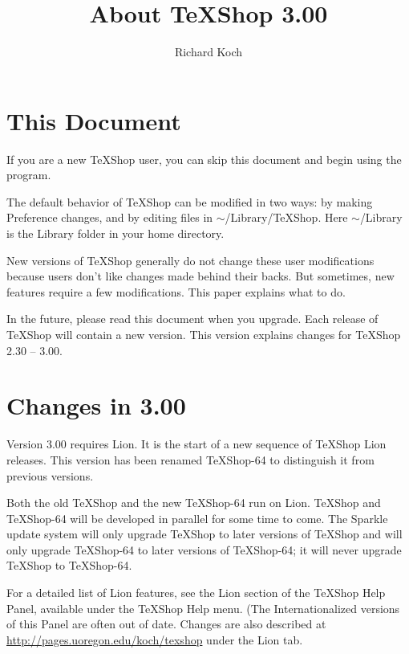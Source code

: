 \documentclass[11pt, oneside]{amsart}
\title{About TeXShop 3.00}
\author{Richard Koch}
\begin{document}
\maketitle

\thispagestyle{empty}
\vspace{-.3in}
\section{This Document}

If you are a new TeXShop user, you can skip this document and begin using the program.

The default behavior of TeXShop can be modified in two ways: by making Preference changes, and by editing files in $\sim$/Library/TeXShop. Here $\sim$/Library is the Library folder in your home directory. 

New versions of TeXShop generally do not change these user modifications because users don't like changes made behind their backs. But sometimes, new features require a few modifications. This paper explains what to do.

In the future, please read this document when you upgrade. Each release of TeXShop will contain a new version. This version explains changes for TeXShop 2.30 -- 3.00.

\section{Changes in 3.00}

Version 3.00 requires Lion. It is the start of a new sequence of TeXShop Lion releases. This version has been renamed TeXShop-64 to distinguish
it from previous versions. 

Both the old TeXShop and the new TeXShop-64 run on Lion. TeXShop and TeXShop-64 will be developed in parallel for some time to come.  The Sparkle update
system will only upgrade TeXShop to later versions of TeXShop and will only upgrade TeXShop-64 to later versions of TeXShop-64; it will never
upgrade TeXShop to TeXShop-64.

For a detailed list of Lion features, see the Lion section of the TeXShop Help Panel, available under the TeXShop Help menu. (The Internationalized versions of
this Panel are often out of date. Changes are also described at \url{http://pages.uoregon.edu/koch/texshop} under the Lion tab.
\end{document}
